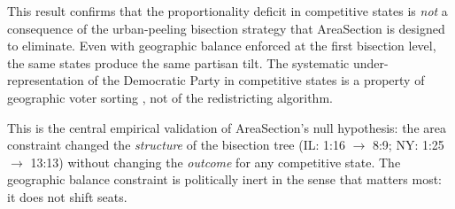 This result confirms that the proportionality deficit in competitive states
is \emph{not} a consequence of the urban-peeling bisection strategy that
AreaSection is designed to eliminate.
Even with geographic balance enforced at the first bisection level,
the same states produce the same partisan tilt.
The systematic under-representation of the Democratic Party in competitive
states is a property of geographic voter sorting
\citep{rodden2019,chen2013}, not of the redistricting algorithm.

This is the central empirical validation of AreaSection's null hypothesis:
the area constraint changed the \emph{structure} of the bisection tree
(IL: 1:16 $\to$ 8:9; NY: 1:25 $\to$ 13:13) without changing the
\emph{outcome} for any competitive state.
The geographic balance constraint is politically inert in the sense that
matters most: it does not shift seats.
